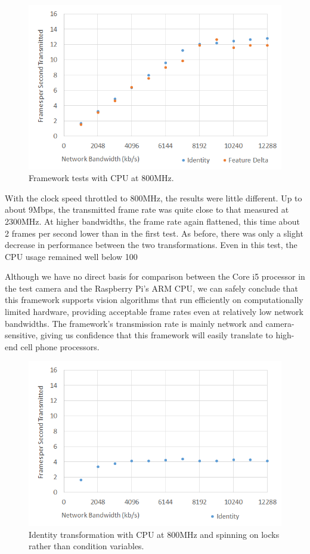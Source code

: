 \begin{figure}
\includegraphics[width=\columnwidth]{figure4.png}
\caption{Framework tests with CPU at 800MHz.}
\end{figure}

With the clock speed throttled to 800MHz, the results were little different.  Up to about
9Mbps, the transmitted frame rate was quite close to that measured at 2300MHz.  At
higher bandwidths, the frame rate again flattened, this time about 2 frames per second
lower than in the first test.  As before, there was only a slight decrease in performance
between the two transformations.  Even in this test, the CPU usage remained well
below 100%

Although we have no direct basis for comparison between the Core i5 processor in the
test camera and the Raspberry Pi's ARM CPU, we can safely conclude that this framework
supports vision algorithms that run efficiently on computationally limited hardware, providing
acceptable frame rates even at relatively low network bandwidths.  The framework's transmission rate
is mainly network and camera-sensitive, giving us confidence that
this framework  will easily translate to high-end cell phone processors.

\begin{figure}
\includegraphics[width=\columnwidth]{figure5.png}
\caption{Identity transformation with CPU at 800MHz and spinning on locks rather than condition variables.}
\end{figure}

